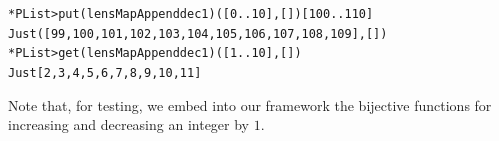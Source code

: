 \begin{alltt}
*PList> put (lensMapAppend dec1) ([0..10],[]) [100..110]
Just ([99,100,101,102,103,104,105,106,107,108,109],[])
*PList> get (lensMapAppend dec1) ([1..10],[])
Just [2,3,4,5,6,7,8,9,10,11]
\end{alltt}
Note that, for testing, we embed into our framework
the bijective functions for increasing and decreasing an integer by \ensuremath{\mathrm{1}}.
\begin{hscode}\SaveRestoreHook
{}%
%
%
%
%
\>[B]{}\mathbin{::}\;\;\<[E]%
\\
\>[B]{}\mathrel{=}\;\;\<[E]%
\\
\>[B]{}\<[3]%
\>[3]{}\;{}\<[10]%
\>[10]{}\;\<[17]%
\>[17]{}\mathrel{=}\mathbin{+}\<[E]%
\\
\>[10]{}\;\;\<[17]%
\>[17]{}\mathrel{=}\mathbin{-}\<[E]%
\ColumnHook
\end{hscode}\resethooks

